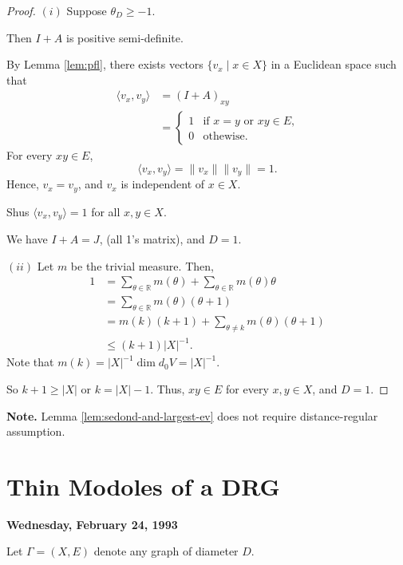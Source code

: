 \documentclass[
]{book}
\theoremstyle{definition}
\theoremstyle{definition}
\theoremstyle{definition}
\theoremstyle{definition}
\theoremstyle{remark}
\begin{document}
\begin{proof}
\((i)\) Suppose \(\theta_D \geq -1\).

Then \(I + A\) is positive semi-definite.

By Lemma \ref{lem:pfl}, there exists vectors \(\{v_x\mid x\in X\}\) in a Euclidean space such that
\begin{align}
\langle v_x,v_y\rangle & = (I+A)_{xy}\\
& = \begin{cases} 1 & \text{if $x = y$ or $xy\in E$,}\\0 & \text{othewise}.
\end{cases}
\end{align}
For every \(xy\in E\),
\[\langle v_x, v_y\rangle = \|v_x\|\|v_y\| = 1.\]
Hence, \(v_x = v_y\), and \(v_x\) is independent of \(x\in X\).

Shus \(\langle v_x,v_y\rangle = 1\) for all \(x,y\in X\).

We have \(I + A = J\), (all 1's matrix), and \(D = 1\).

\((ii)\) Let \(m\) be the trivial measure. Then,
\begin{align}
1 & = \sum_{\theta\in \mathbb{R}}m(\theta) + \sum_{\theta\in \mathbb{R}}m(\theta)\theta \\
& = \sum_{\theta\in \mathbb{R}}m(\theta)(\theta+1)\\
& = m(k)(k+1) + \sum_{\theta\neq k}m(\theta)(\theta+1)\\
& \leq (k+1)|X|^{-1}.
\end{align}
Note that \(m(k) = |X|^{-1}\dim d_0V = |X|^{-1}\).

So \(k+1 \geq |X|\) or \(k = |X|-1\). Thus,
\(xy\in E\) for every \(x,y\in X\), and \(D = 1\).
\end{proof}

\textbf{Note.}
Lemma \ref{lem:sedond-and-largest-ev} does not require distance-regular assumption.

\hypertarget{lec16}{%
\chapter{Thin Modoles of a DRG}\label{lec16}}

\textbf{Wednesday, February 24, 1993}

Let \(\Gamma = (X, E)\) denote any graph of diameter \(D\).
\end{document}
